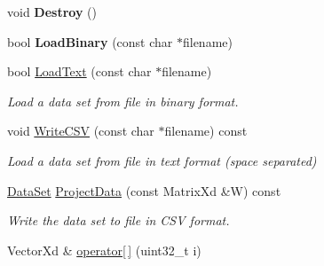 \begin{DoxyCompactItemize}
\item 
\hypertarget{struct_d_r_d_s_p_1_1_data_set_a65d09f3c71c115517a5df8ce96f26117}{void {\bfseries Destroy} ()}\label{struct_d_r_d_s_p_1_1_data_set_a65d09f3c71c115517a5df8ce96f26117}

\item 
\hypertarget{struct_d_r_d_s_p_1_1_data_set_a0ffb95866863d3b2bad35b0c68c6c7f3}{bool {\bfseries Load\-Binary} (const char $\ast$filename)}\label{struct_d_r_d_s_p_1_1_data_set_a0ffb95866863d3b2bad35b0c68c6c7f3}

\item 
\hypertarget{struct_d_r_d_s_p_1_1_data_set_a9caf2a2c685f1433028de6d3c11bd758}{bool \hyperlink{struct_d_r_d_s_p_1_1_data_set_a9caf2a2c685f1433028de6d3c11bd758}{Load\-Text} (const char $\ast$filename)}\label{struct_d_r_d_s_p_1_1_data_set_a9caf2a2c685f1433028de6d3c11bd758}

\begin{DoxyCompactList}\small\item\em Load a data set from file in binary format. \end{DoxyCompactList}\item 
\hypertarget{struct_d_r_d_s_p_1_1_data_set_a1d90f86c1fbe0380d91158b1c050c501}{void \hyperlink{struct_d_r_d_s_p_1_1_data_set_a1d90f86c1fbe0380d91158b1c050c501}{Write\-C\-S\-V} (const char $\ast$filename) const }\label{struct_d_r_d_s_p_1_1_data_set_a1d90f86c1fbe0380d91158b1c050c501}

\begin{DoxyCompactList}\small\item\em Load a data set from file in text format (space separated) \end{DoxyCompactList}\item 
\hypertarget{struct_d_r_d_s_p_1_1_data_set_a0f42640d4f826807b69830bf3617152c}{\hyperlink{struct_d_r_d_s_p_1_1_data_set}{Data\-Set} \hyperlink{struct_d_r_d_s_p_1_1_data_set_a0f42640d4f826807b69830bf3617152c}{Project\-Data} (const Matrix\-Xd \&W) const }\label{struct_d_r_d_s_p_1_1_data_set_a0f42640d4f826807b69830bf3617152c}

\begin{DoxyCompactList}\small\item\em Write the data set to file in C\-S\-V format. \end{DoxyCompactList}\item 
\hypertarget{struct_d_r_d_s_p_1_1_data_set_ae82340f4e02cb4ca434dc9361716eef0}{Vector\-Xd \& \hyperlink{struct_d_r_d_s_p_1_1_data_set_ae82340f4e02cb4ca434dc9361716eef0}{operator\mbox{[}$\,$\mbox{]}} (uint32\-\_\-t i)}\label{struct_d_r_d_s_p_1_1_data_set_ae82340f4e02cb4ca434dc9361716eef0}


\end{DoxyCompactItemize}
